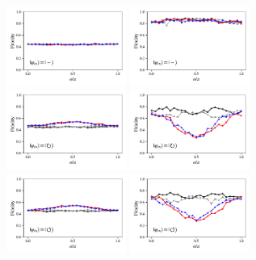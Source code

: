 \documentclass[a4paper]{article}
\begin{document}
\begin{figure}[H]
	\\
	\includegraphics[width=0.35\textwidth]{fidelity_qc6_mit1_state3}
	\includegraphics[width=0.35\textwidth]{fidelity_qc6_mit0_state3}
	\\
	\includegraphics[width=0.35\textwidth]{fidelity_qc6_mit1_state4}
	\includegraphics[width=0.35\textwidth]{fidelity_qc6_mit0_state4}
	\\
	\includegraphics[width=0.35\textwidth]{fidelity_qc6_mit1_state5}
	\includegraphics[width=0.35\textwidth]{fidelity_qc6_mit0_state5}
\end{figure}
\end{document}

